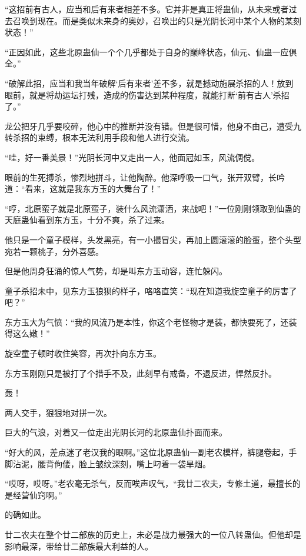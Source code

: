 
\begin{this_body}

“这招前有古人，应当和后有来者相差不多。它并非是真正将蛊仙，从未来或者过去召唤到现在。而是类似未来身的奥妙，召唤出的只是光阴长河中某个人物的某刻状态！”

“正因如此，这些北原蛊仙一个个几乎都处于自身的巅峰状态，仙元、仙蛊一应俱全。”

“破解此招，应当和我当年破解‘后有来者’差不多，就是撼动施展杀招的人！放到眼前，就是将劫运坛打残，造成的伤害达到某种程度，就能打断‘前有古人’杀招了。”

龙公把牙几乎要咬碎，他心中的推断并没有错。但是很可惜，他身不由己，遭受九转杀招的束缚，根本无法利用手段和他人进行交流。

“哇，好一番美景！”光阴长河中又走出一人，他面冠如玉，风流倜傥。

眼前的生死搏杀，惨烈地拼斗，让他陶醉。他深呼吸一口气，张开双臂，长吟道：“看来，这就是我东方玉的大舞台了！”

“哼，北原蛮子就是北原蛮子，装什么风流潇洒，来战吧！”一位刚刚领取到仙蛊的天庭蛊仙看到东方玉，十分不爽，杀了过来。

他只是一个童子模样，头发黑亮，有一小撮冒尖，再加上圆滚滚的脸蛋，整个头型宛若一颗桃子，分外喜感。

但是他周身狂涌的惊人气势，却是叫东方玉动容，连忙躲闪。

童子杀招未中，见东方玉狼狈的样子，咯咯直笑：“现在知道我旋空童子的厉害了吧？”

东方玉大为气愤：“我的风流乃是本性，你这个老怪物才是装，都快要死了，还装得这么嫩！”

旋空童子顿时收住笑容，再次扑向东方玉。

东方玉刚刚只是被打了个措手不及，此刻早有戒备，不退反进，悍然反扑。

轰！

两人交手，狠狠地对拼一次。

巨大的气浪，对着又一位走出光阴长河的北原蛊仙扑面而来。

“好大的风，差点迷了老汉我的眼啊。”这位北原蛊仙一副老农模样，裤腿卷起，手脚沾泥，腰背佝偻，脸上皱纹深刻，嘴上叼着一袋旱烟。

“哎呀，哎呀。”老农毫无杀气，反而唉声叹气，“我廿二农夫，专修土道，最擅长的是经营仙窍啊。”

的确如此。

廿二农夫在整个廿二部族的历史上，未必是战力最强大的一位八转蛊仙。但他却是影响最深，带给廿二部族最大利益的人。


\end{this_body}
